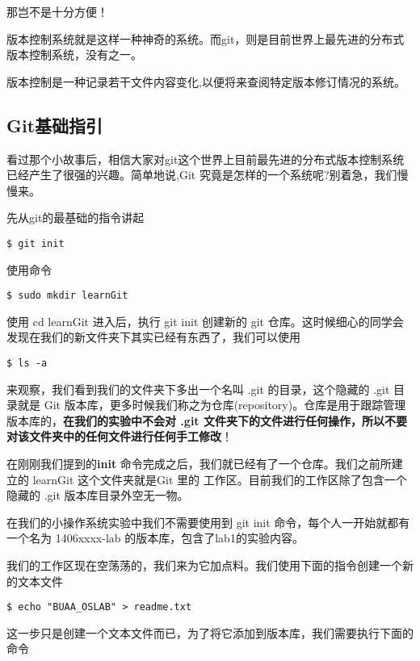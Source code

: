 那岂不是十分方便！

版本控制系统就是这样一种神奇的系统。而git，则是目前世界上最先进的分布式版本控制系统，没有之一。
\begin{note}
版本控制是一种记录若干文件内容变化,以便将来查阅特定版本修订情况的系统。
\end{note}

\subsection{Git基础指引}
看过那个小故事后，相信大家对git这个世界上目前最先进的分布式版本控制系统已经产生了很强的兴趣。简单地说,Git 究竟是怎样的一个系统呢?别着急，我们慢慢来。

先从git的最基础的指令讲起

\begin{verbatim}
$ git init
\end{verbatim}

使用命令
\begin{verbatim}
$ sudo mkdir learnGit
\end{verbatim}
使用 cd learnGit 进入后，执行 git init 创建新的 git 仓库。这时候细心的同学会发现在我们的新文件夹下其实已经有东西了，我们可以使用
\begin{verbatim}
$ ls -a
\end{verbatim}
来观察，我们看到我们的文件夹下多出一个名叫 .git 的目录，这个隐藏的 .git 目录就是 Git 版本库，更多时候我们称之为仓库(repository)。仓库是用于跟踪管理版本库的，\textbf{在我们的实验中不会对 .git 文件夹下的文件进行任何操作，所以不要对该文件夹中的任何文件进行任何手工修改}！

在刚刚我们提到的\textbf{init} 命令完成之后，我们就已经有了一个仓库。我们之前所建立的 learnGit 这个文件夹就是Git 里的 工作区。目前我们的工作区除了包含一个隐藏的 .git 版本库目录外空无一物。

\begin{note}
在我们的小操作系统实验中我们不需要使用到 git init 命令，每个人一开始就都有一个名为 1406xxxx-lab 的版本库，包含了lab1的实验内容。
\end{note}

我们的工作区现在空荡荡的，我们来为它加点料。我们使用下面的指令创建一个新的文本文件
\begin{verbatim}
$ echo "BUAA_OSLAB" > readme.txt
\end{verbatim}

这一步只是创建一个文本文件而已，为了将它添加到版本库，我们需要执行下面的命令

